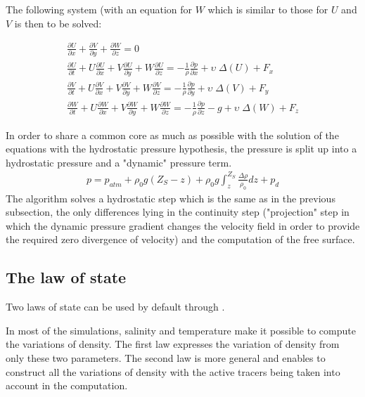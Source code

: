 The following system (with an equation for $W$ which is similar to those
for $U$ and $V$ is then to be solved:

\begin{subequations}
\begin{align}
\frac{\partial U}{\partial x} +\frac{\partial V}{\partial
y} +\frac{\partial W}{\partial z} = 0
\\
\frac{\partial U}{\partial t}
+U\frac{\partial U}{\partial x} +V\frac{\partial U}{\partial y}
+W\frac{\partial U}{\partial z} =-\frac{1}{\rho } \frac{\partial p}{\partial x}
+\upsilon \; \Delta \left(U\right)+F_{x}
\\
\frac{\partial V}{\partial t}
+U\frac{\partial V}{\partial x} +V\frac{\partial V}{\partial y}
+W\frac{\partial V}{\partial z} =-\frac{1}{\rho } \frac{\partial p}{\partial y}
+\upsilon \; \Delta \left(V\right)+F_{y}
\\
\frac{\partial W}{\partial t}
+U\frac{\partial W}{\partial x} +V\frac{\partial W}{\partial y}
+W\frac{\partial W}{\partial z} =-\frac{1}{\rho } \frac{\partial p}{\partial z}
-g+\upsilon \; \Delta \left(W\right)+F_{z}
\end{align}
\end{subequations}

In order to share a common core as much as possible with the solution of the
equations with the hydrostatic pressure hypothesis, the pressure is split up
into a hydrostatic pressure and a "dynamic" pressure term.
\begin{align}
p=p_{atm} +\rho _{0} g\left(Z_{S} -z\right)+\rho _{0} g\int _{z}^{Z_{S}
}\frac{\Delta \rho }{\rho _{0} } dz +p_{d}
\end{align}
The  algorithm solves a hydrostatic step which is the same as in the
previous subsection, the only differences lying in the continuity step
("projection" step in which the dynamic pressure gradient changes the velocity
field in order to provide the required zero divergence of velocity) and the
computation of the free surface.

\subsection{The law of state}

Two laws of state can be used by default through .

In most of the simulations, salinity and temperature make it possible to
compute the variations of density. The first law expresses the variation of
density from only these two parameters. The second law is more general and
enables to construct all the variations of density with the active tracers
being taken into account in the computation.

